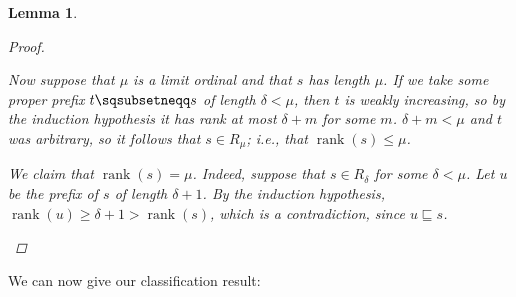 \documentclass[11pt]{article} %
\theoremstyle{plain} %
\newtheorem{lemma}[theorem]{Lemma}
\theoremstyle{definition} %
\theoremstyle{note}
\theoremstyle{exercisestyle}
\newcommand{\prefix}{\sqsubseteq}
\newcommand{\pprefix}{\sqsubsetneqq}
\DeclareMathOperator{\rank}{rank}
\begin{document}
\begin{lemma}
\begin{proof}
\begin{enumerate}[(i): ]
        Now suppose that $\mu$ is a limit ordinal and that $s$ has length $\mu$.  If we take some proper prefix $t\pprefix s$ of length $\delta<\mu$, then $t$ is weakly increasing, so by the induction hypothesis it has rank at most $\delta+m$ for some $m$.  $\delta+m<\mu$ and $t$ was arbitrary, so it follows that $s\in R_\mu$; i.e., that $\rank(s)\le\mu$.  

        We claim that $\rank(s)=\mu$.  Indeed, suppose that $s\in R_\delta$ for some $\delta<\mu$.  Let $u$ be the prefix of $s$ of length $\delta+1$.  By the induction hypothesis, $\rank(u)\ge\delta+1>\rank(s)$, which is a contradiction, since $u\prefix s$.  \qedhere
    \end{enumerate}
  \end{proof}
\end{lemma}

We can now give our classification result:
\end{document}
